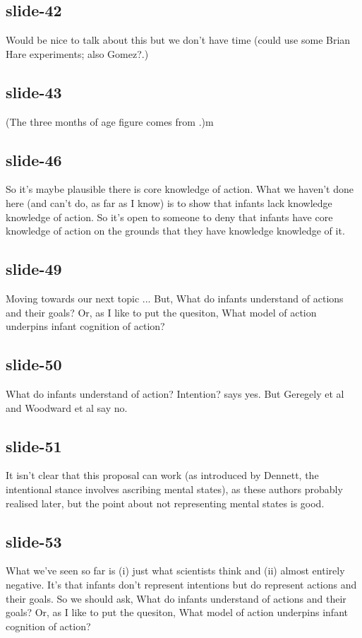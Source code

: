 \documentclass[12pt,\papersize]{extarticle}
\begin{document}
 
\subsection{slide-42}
Would be nice to talk about this but we don't have time (could use some Brian Hare experiments; also Gomez?.)
 
 
\subsection{slide-43}
(The three months of age figure comes from \citet{Sommerville:2005te}.)m
 
 
\subsection{slide-46}
So it's maybe plausible there is core knowledge of action.
What we haven't done here (and can't do, as far as I know) is to show that infants lack knowledge knowledge of action.
So it's open to someone to deny that infants have core knowledge of action on the grounds that they have knowledge knowledge of it.
 
 
\subsection{slide-49}
Moving towards our next topic ...
But, What do infants understand of actions and their goals?
Or, as I like to put the quesiton, What model of action underpins infant cognition of action?
 
 
\subsection{slide-50}
What do infants understand of action? Intention?
\citet{Premack:1990jl} says yes.
But Geregely et al and Woodward et al say no.
 
 
\subsection{slide-51}
It isn't clear that this proposal can work (as introduced by Dennett, the intentional stance involves ascribing mental states), as these authors probably realised later, but the point about not representing mental states is good.
 
 
\subsection{slide-53}
What we've seen so far is (i) just what scientists think and (ii) almost entirely negative.
It's that infants don't represent intentions but do represent actions and their goals.
So we should ask, What do infants understand of actions and their goals?
Or, as I like to put the quesiton, What model of action underpins infant cognition of action?
 
\end{document}
